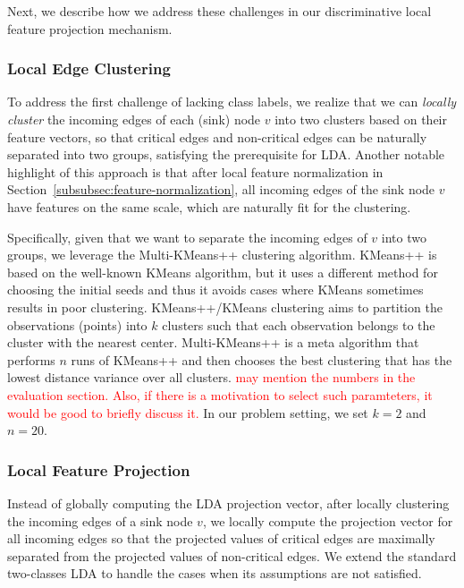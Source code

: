 Next, we describe how we address these challenges in our discriminative local feature projection mechanism.


\subsubsection{Local Edge Clustering}
To address the first challenge of lacking class labels, we realize that we can \emph{locally cluster} the incoming edges of each (sink) node $v$ into two clusters based on their feature vectors, so that critical edges and non-critical edges can be naturally separated into two groups, satisfying the prerequisite for LDA. Another notable highlight of this approach is that after local feature normalization in Section~\ref{subsubsec:feature-normalization}, all incoming edges of the sink node $v$ have features on the same scale, which are naturally fit for the clustering.

Specifically, given that we want to separate the incoming edges of $v$ into two groups, we leverage the Multi-KMeans++ clustering algorithm. KMeans++ is based on the well-known KMeans algorithm, but it uses a different method for choosing the initial seeds and thus it avoids cases where KMeans sometimes results in poor clustering. KMeans++/KMeans clustering aims to partition the observations (points) into $k$ clusters such that each observation belongs to the cluster with the nearest center. Multi-KMeans++ is a meta algorithm that performs $n$ runs of KMeans++ and then chooses the best clustering that has the lowest distance variance over all clusters.
\textcolor{red}{may mention the numbers in the evaluation section. Also, if there is a motivation to select such paramteters, it would be good to briefly discuss it.} In our problem setting, we set $k = 2$ and $n = 20$.


\subsubsection{Local Feature Projection}
Instead of globally computing the LDA projection vector, after locally clustering the incoming edges of a sink node $v$, we locally compute the projection vector for all incoming edges so that the projected values of critical edges are maximally separated from the projected values of non-critical edges. We extend the standard two-classes LDA to handle the cases when its assumptions are not satisfied.

